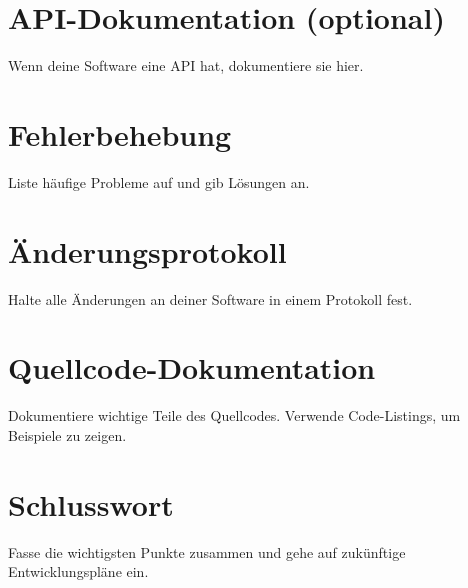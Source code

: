 \documentclass[a4paper, 12pt]{article}
\begin{document}
    \section{API-Dokumentation (optional)}
    Wenn deine Software eine API hat, dokumentiere sie hier.

    \section{Fehlerbehebung}
    Liste häufige Probleme auf und gib Lösungen an.

    \section{Änderungsprotokoll}
    Halte alle Änderungen an deiner Software in einem Protokoll fest.

    \section{Quellcode-Dokumentation}
    Dokumentiere wichtige Teile des Quellcodes. Verwende Code-Listings, um Beispiele zu zeigen.

    \section{Schlusswort}
    Fasse die wichtigsten Punkte zusammen und gehe auf zukünftige Entwicklungspläne ein.
\end{document}
